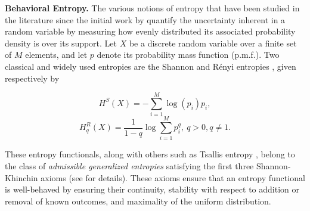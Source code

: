 \textbf{Behavioral Entropy.} The various notions of entropy that have been studied in the literature since the initial work by \cite{shannon1948entropy} quantify the uncertainty inherent in a random variable by measuring how evenly distributed its associated probability density is over its support. Let $X$ be a discrete random variable over a finite set of $M$ elements, and let $p$ denote its probability mass function (p.m.f.). Two classical and widely used entropies are the Shannon and R\'{e}nyi entropies \citep{shannon1948entropy, renyi1961measures}, given respectively by
%
\begin{multicols}{2}
    \noindent
    \begin{equation} \label{eqn:shannon}
        H^S(X) = - \sum_{i=1}^M \log(p_i) p_i,
    \end{equation}
    \noindent
    \begin{equation} \label{eqn:renyi}
        H^R_q(X) = \frac{1}{1-q} \log \sum_{i=1}^M p_i^q, \ q > 0, q \neq 1.
    \end{equation}
\end{multicols}
%
These entropy functionals, along with others such as Tsallis entropy \citep{tsallis1988possible}, belong to the class of \textit{admissible generalized entropies} satisfying the first three Shannon-Khinchin axioms (see \citep{Amigo2018entropy} for details). These axioms ensure that an entropy functional is well-behaved by ensuring their continuity, stability with respect to addition or removal of known outcomes, and maximality of the uniform distribution.

